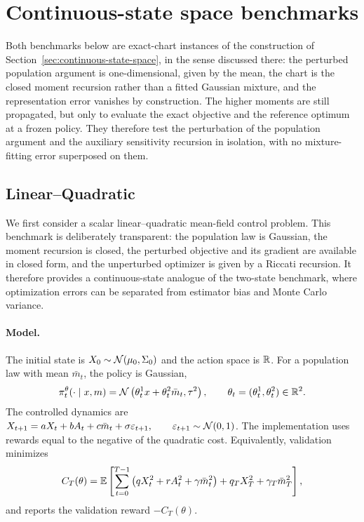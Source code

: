 \section{Continuous-state space benchmarks}

Both benchmarks below are exact-chart instances of the construction of Section~\ref{sec:continuous-state-space}, in the sense discussed there: the perturbed population argument is one-dimensional, given by the mean, the chart is the closed moment recursion rather than a fitted Gaussian mixture, and the representation error vanishes by construction. The higher moments are still propagated, but only to evaluate the exact objective and the reference optimum at a frozen policy. They therefore test the perturbation of the population argument and the auxiliary sensitivity recursion in isolation, with no mixture-fitting error superposed on them.


\subsection{Linear--Quadratic}
\label{subsec:linear-quadratic}

We first consider a scalar linear--quadratic mean-field control problem. This benchmark is deliberately transparent: the population law is Gaussian, the moment recursion is closed, the perturbed objective and its gradient are available in closed form, and the unperturbed optimizer is given by a Riccati recursion. It therefore provides a continuous-state analogue of the two-state benchmark, where optimization errors can be separated from estimator bias and Monte Carlo variance.

\paragraph{Model.}
The initial state is $X_0\sim{\cal N}(\mu_0,\Sigma_0)$ and the action space is $\mathbb{R}$. For a population law with mean $\bar m_t$, the policy is Gaussian,
\begin{align}
    \pi_t^\theta(\cdot\mid x,m)
    =
    {\cal N}\left(\theta_t^1x+\theta_t^2\bar m_t,\tau^2\right),
    \qquad
    \theta_t=(\theta_t^1,\theta_t^2)\in\mathbb{R}^2.
\end{align}
The controlled dynamics are $X_{t+1} = aX_t+bA_t+c\bar m_t+\sigma \varepsilon_{t+1}, \qquad \varepsilon_{t+1}\sim{\cal N}(0,1)$.
The implementation uses rewards equal to the negative of the quadratic cost. Equivalently, validation minimizes
\begin{align}
    C_T(\theta)
    =
    \mathbb{E}\left[
        \sum_{t=0}^{T-1}
        \left(qX_t^2+rA_t^2+\gamma \bar m_t^2\right)
        +q_TX_T^2+\gamma_T\bar m_T^2
    \right],
\end{align}
and reports the validation reward $-C_T(\theta)$.


